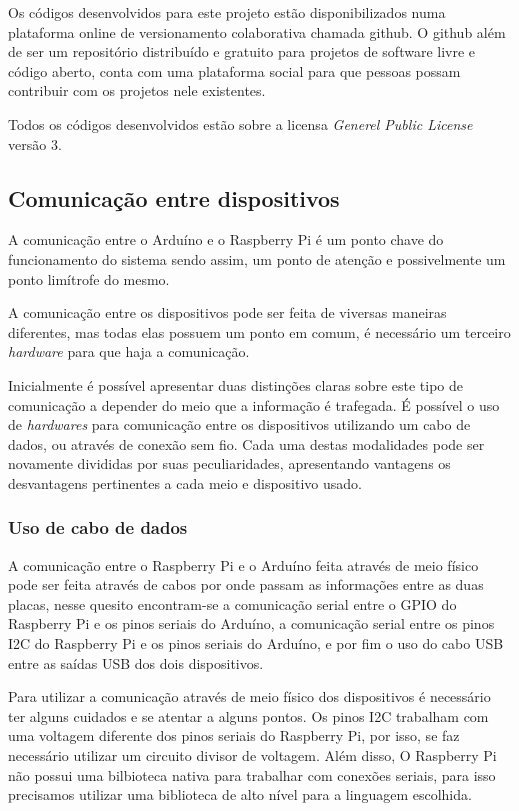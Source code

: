 \documentclass[final,12pt, times, 5p, twocolumn]{elsarticle}
\begin{document}
Os códigos desenvolvidos para este projeto estão disponibilizados numa plataforma online de versionamento colaborativa chamada \cite{github} github. O github além de ser um repositório distribuído e gratuito para projetos de software livre e código aberto, conta com uma plataforma social para que pessoas possam contribuir com os projetos nele existentes.

Todos os códigos desenvolvidos estão sobre a licensa \textit{Generel Public License} versão 3.

\subsection{Comunicação entre dispositivos}

A comunicação entre o Arduíno e o Raspberry Pi é um ponto chave do funcionamento do sistema sendo assim, um ponto de atenção e possivelmente um ponto limítrofe do mesmo.

A comunicação entre os dispositivos pode ser feita de viversas maneiras diferentes, mas todas elas possuem um ponto em comum, é necessário um terceiro \textit{hardware} para que haja a comunicação.

Inicialmente é possível apresentar duas distinções claras sobre este tipo de comunicação a depender do meio que a informação é trafegada. É possível o uso de \textit{hardwares} para  comunicação entre os dispositivos utilizando um cabo de dados, ou através de conexão sem fio. Cada uma destas modalidades pode ser novamente divididas por suas peculiaridades, apresentando vantagens os desvantagens pertinentes a cada meio e dispositivo usado.

\subsubsection{Uso de cabo de dados}

A comunicação entre o Raspberry Pi e o Arduíno feita através de meio físico pode ser feita através de cabos por onde passam as informações entre as duas placas, nesse quesito encontram-se a comunicação serial entre o GPIO do Raspberry Pi e os pinos seriais do Arduíno, a comunicação serial entre os pinos I2C do Raspberry Pi e os pinos seriais  do Arduíno, e por fim o uso do cabo USB entre as saídas USB dos dois dispositivos.

Para utilizar a comunicação através de meio físico dos dispositivos é necessário ter alguns cuidados e se atentar a alguns pontos. Os pinos I2C trabalham com uma voltagem diferente dos pinos seriais do Raspberry Pi, por isso, se faz necessário utilizar um circuito divisor de voltagem. Além disso, O Raspberry Pi não possui uma bilbioteca nativa para trabalhar com conexões seriais, para isso precisamos utilizar uma biblioteca de alto nível para a linguagem escolhida.
\end{document}
